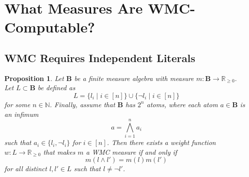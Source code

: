 \documentclass{article}
\newtheorem{proposition}{Proposition}
\theoremstyle{definition}
\theoremstyle{remark}
\begin{document}


\section{What Measures Are WMC-Computable?}


\subsection{WMC Requires Independent Literals}


\begin{proposition}
  Let $\mathbf{B}$ be a finite measure algebra with measure $m\colon \mathbf{B} \to
  \mathbb{R}_{\ge 0}$. Let $L \subset \mathbf{B}$ be defined as
  \[
  L = \{ l_i \mid i \in [n] \} \cup \{ \neg l_i \mid i \in [n] \}
  \]
  for some $n \in \mathbb{N}$. Finally, assume that $\mathbf{B}$ has $2^n$
  atoms, where each atom $a \in \mathbf{B}$ is an infimum
  \[
    a = \bigwedge_{i=1}^n a_i
  \]
  such that $a_i \in \{ l_i, \neg l_i \}$ for $i \in [n]$. Then there exists a
  weight function $w\colon L \to \mathbb{R}_{\ge 0}$ that makes $m$ a WMC measure if
  and only if
  \begin{equation} \label{eq:wmccondition}
  m(l \land l') = m(l)m(l')
  \end{equation}
  for all distinct $l, l' \in L$ such that $l \ne \neg l'$.
\end{proposition}
\end{document}
